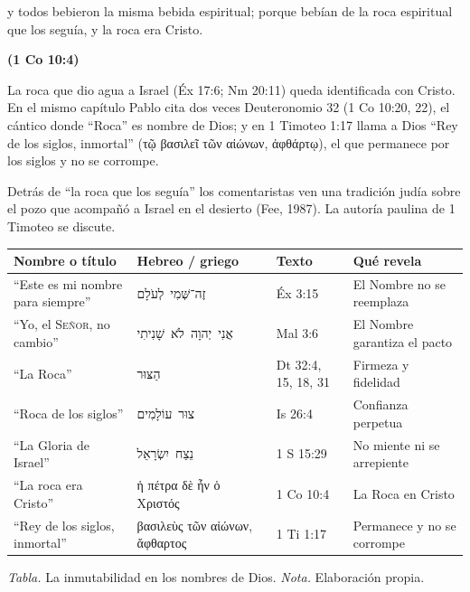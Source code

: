 \documentclass[11pt,letterpaper]{article}
\newcommand{\heb}[1]{\mbox{\foreignlanguage{hebrew}{#1}}}
\newcommand{\grc}[1]{\foreignlanguage{ancientgreek}{#1}}
\newcommand{\SENOR}{\textsc{Señor}}
\newcommand{\fuente}[1]{\par\hfill{\upshape\bfseries\small\textcolor{azul}{#1}}}
\begin{document}
\begin{cita}y todos bebieron la misma bebida espiritual; porque bebían de la roca espiritual que los seguía, y la roca era Cristo.\fuente{(1 Co 10:4)}\end{cita}

La roca que dio agua a Israel (Éx 17:6; Nm 20:11) queda identificada con Cristo. En el mismo capítulo Pablo cita dos veces Deuteronomio 32 (1 Co 10:20, 22), el cántico donde ``Roca'' es nombre de Dios; y en 1 Timoteo 1:17 llama a Dios ``Rey de los siglos, inmortal'' (\grc{τῷ βασιλεῖ τῶν αἰώνων, ἀφθάρτῳ}), el que permanece por los siglos y no se corrompe.

\begin{nota}[Precisión]
Detrás de ``la roca que los seguía'' los comentaristas ven una tradición judía sobre el pozo que acompañó a Israel en el desierto (Fee, 1987). La autoría paulina de 1 Timoteo se discute.
\end{nota}

\begin{center}
\small\renewcommand{\arraystretch}{1.2}
\begin{tabular}{@{}L{4.0cm}L{3.8cm}L{2.8cm}L{4.6cm}@{}}
\toprule
\textbf{Nombre o título} & \textbf{Hebreo / griego} & \textbf{Texto} & \textbf{Qué revela} \\ \midrule
``Este es mi nombre para siempre'' & \heb{זֶה־שְּׁמִי לְעֹלָם} & Éx 3:15 & El Nombre no se reemplaza \\
``Yo, el \SENOR, no cambio'' & \heb{אֲנִי יְהוָה לֹא שָׁנִיתִי} & Mal 3:6 & El Nombre garantiza el pacto \\
``La Roca'' & \heb{הַצּוּר} & Dt 32:4, 15, 18, 31 & Firmeza y fidelidad \\
``Roca de los siglos'' & \heb{צוּר עוֹלָמִים} & Is 26:4 & Confianza perpetua \\
``La Gloria de Israel'' & \heb{נֵצַח יִשְׂרָאֵל} & 1 S 15:29 & No miente ni se arrepiente \\
``La roca era Cristo'' & \grc{ἡ πέτρα δὲ ἦν ὁ Χριστός} & 1 Co 10:4 & La Roca en Cristo \\
``Rey de los siglos, inmortal'' & \grc{βασιλεὺς τῶν αἰώνων, ἄφθαρτος} & 1 Ti 1:17 & Permanece y no se corrompe \\ \bottomrule
\end{tabular}\par\smallskip
{\footnotesize\color{gris}\textit{Tabla.} La inmutabilidad en los nombres de Dios. \textit{Nota.} Elaboración propia.}
\end{center}
\end{document}
